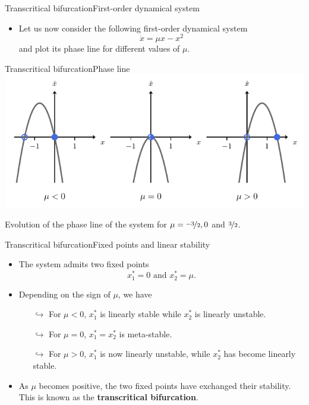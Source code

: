 \documentclass[usenames,dvipsnames,svgnames,10pt,aspectratio=169]{beamer}
\begin{document}
\begin{frame}[t, c]{Transcritical bifurcation}{First-order dynamical system}
	\begin{itemize}
		\item Let us now consider the following first-order dynamical system
		$$\dot{x} = \mu x - x^2$$
		and plot its phase line for different values of $\mu$.
	\end{itemize}

	\vspace{1cm}
\end{frame}

\begin{frame}[t, c]{Transcritical bifurcation}{Phase line}
	\centering
	\includegraphics[width=.75\textwidth]{transcritical_phase_line}

	Evolution of the phase line of the system for $\mu = \nicefrac{-3}{2}, 0$ and $\nicefrac{3}{2}$.

	\vspace{1cm}
\end{frame}

\begin{frame}[t, c]{Transcritical bifurcation}{Fixed points and linear stability}
	\begin{itemize}
		\item The system admits two fixed points
		$$x_1^ * = 0 \text{ and } x_2^* = \mu.$$

		\item Depending on the sign of $\mu$, we have
		\begin{itemize}
			\item[$\hookrightarrow$] For $\mu < 0$, $x_1^*$ is linearly stable while $x_2^*$ is linearly unstable.
			\item[$\hookrightarrow$] For $\mu=0$, $x_1^* = x_2^*$ is meta-stable.
			\item[$\hookrightarrow$] For $\mu > 0$, $x_1^*$ is now linearly unstable, while $x_2^*$ has become linearly stable.
		\end{itemize}

		\medskip

		\item As $\mu$ becomes positive, the two fixed points have exchanged their stability. This is known as the \alert{\textbf{transcritical bifurcation}}.
	\end{itemize}

	\vspace{1cm}
\end{frame}
\end{document}
